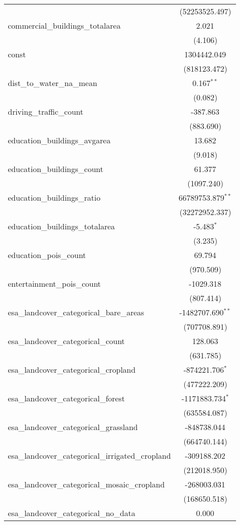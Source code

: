 \begin{table}[!htbp]
\begin{tabular}{@{\extracolsep{5pt}}lc}
  & (52253525.497) \\
 commercial_buildings_totalarea & 2.021$^{}$ \\
  & (4.106) \\
 const & 1304442.049$^{}$ \\
  & (818123.472) \\
 dist_to_water_na_mean & 0.167$^{**}$ \\
  & (0.082) \\
 driving_traffic_count & -387.863$^{}$ \\
  & (883.690) \\
 education_buildings_avgarea & 13.682$^{}$ \\
  & (9.018) \\
 education_buildings_count & 61.377$^{}$ \\
  & (1097.240) \\
 education_buildings_ratio & 66789753.879$^{**}$ \\
  & (32272952.337) \\
 education_buildings_totalarea & -5.483$^{*}$ \\
  & (3.235) \\
 education_pois_count & 69.794$^{}$ \\
  & (970.509) \\
 entertainment_pois_count & -1029.318$^{}$ \\
  & (807.414) \\
 esa_landcover_categorical_bare_areas & -1482707.690$^{**}$ \\
  & (707708.891) \\
 esa_landcover_categorical_count & 128.063$^{}$ \\
  & (631.785) \\
 esa_landcover_categorical_cropland & -874221.706$^{*}$ \\
  & (477222.209) \\
 esa_landcover_categorical_forest & -1171883.734$^{*}$ \\
  & (635584.087) \\
 esa_landcover_categorical_grassland & -848738.044$^{}$ \\
  & (664740.144) \\
 esa_landcover_categorical_irrigated_cropland & -309188.202$^{}$ \\
  & (212018.950) \\
 esa_landcover_categorical_mosaic_cropland & -268003.031$^{}$ \\
  & (168650.518) \\
 esa_landcover_categorical_no_data & 0.000$^{}$ \\

\end{tabular}
\end{table}
